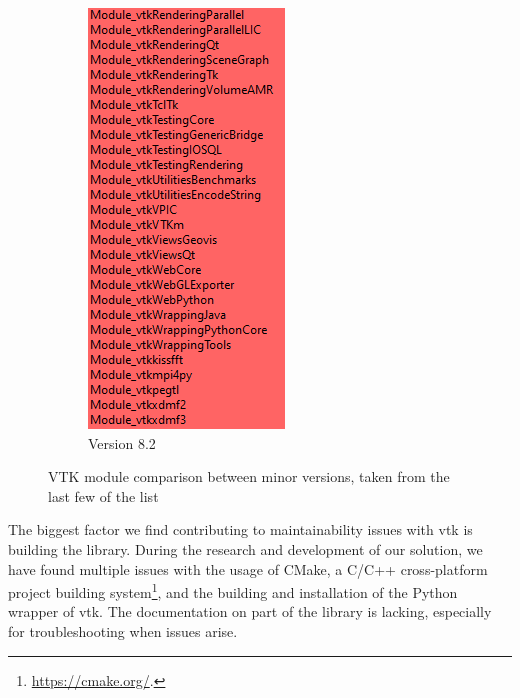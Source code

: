 \begin{figure}
\begin{subfigure}{.45\textwidth}
        \includegraphics[width=.7\linewidth]{pictures/Vtk-8.2.0-modules-cmake.PNG}
        \caption{Version 8.2}
        \label{fig:sub2}
    \end{subfigure}
    \caption{VTK module comparison between minor versions, taken from the last few of the list}
    \label{fig:vtk-module-comp}
\end{figure}

The biggest factor we find contributing to maintainability issues with \acrshort{vtk} is building the library. During the research and development of our solution, we have found multiple issues with the usage of CMake, a C/C++ cross-platform project building system\footnote{\url{https://cmake.org/}.}, and the building and installation of the Python wrapper of \acrshort{vtk}. The documentation on part of the library is lacking, especially for troubleshooting when issues arise.

